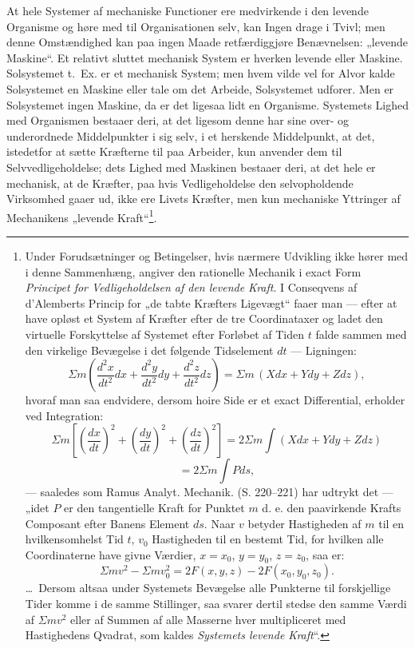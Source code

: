 \documentclass[11pt]{book}
\begin{document}
At hele Systemer af mechaniske Functioner ere medvirkende i den
levende Organisme og høre med til Organisationen selv, kan Ingen drage
i Tvivl; men denne Omstændighed kan paa ingen Maade retfærdiggjøre
Benævnelsen: „levende Maskine“. Et relativt sluttet mechanisk System
er hverken levende eller Maskine. Solsystemet t.~Ex. er et mechanisk
System; men hvem vilde vel for Alvor kalde Solsystemet en Maskine
eller tale om det Arbeide, Solsystemet udforer. Men er Solsystemet
ingen Maskine, da er det ligesaa lidt en Organisme. Systemets Lighed
med Organismen bestaaer deri, at det ligesom denne har sine over- og
underordnede Middelpunkter i sig selv, i et herskende Middelpunkt, at
det, istedetfor at sætte Kræfterne til paa Arbeider, kun anvender dem
til Selvvedligeholdelse; dets Lighed med Maskinen bestaaer deri, at det
hele er mechanisk, at de Kræfter, paa hvis Vedligeholdelse den
selvopholdende Virksomhed gaaer ud, ikke ere Livets Kræfter, men kun
mechaniske Yttringer af Mechanikens „levende Kraft“\footnote{Under
Forudsætninger og Betingelser, hvis nærmere Udvikling ikke hører med i denne
Sammenhæng, angiver den rationelle Mechanik i exact Form \emph{Principet
for Vedligeholdelsen af den levende Kraft}. I Conseqvens af d'Alemberts
Princip
for „de tabte Kræfters Ligevægt“ faaer man --- efter at have opløst et
System af Kræfter efter de tre Coordinataxer og ladet den virtuelle
Forskyttelse af Systemet efter Forløbet af Tiden $t$ falde sammen med den
virkelige Bevægelse i det følgende Tidselement $dt$ --- Ligningen:
\[ \Sigma m\left(\frac{d^2x}{dt^2}dx + \frac{d^2y}{dt^2}dy
 + \frac{d^2z}{dt^2}dz\right) = \Sigma m\,(Xdx + Ydy + Zdz), \]
hvoraf man saa endvidere, dersom hoire Side er et exact Differential, erholder
ved Integration:
\[ \Sigma m\left[\left(\frac{dx}{dt}\right)^2 + \left(\frac{dy}{dt}\right)^2
 + \left(\frac{dz}{dt}\right)^2\right] = 2\Sigma m\int(Xdx + Ydy + Zdz) \]
\[ = 2\Sigma m\int Pds, \]
--- saaledes som Ramus Analyt. Mechanik. (S. 220--221) har udtrykt det ---
„idet $P$ er den tangentielle Kraft for Punktet $m$ d. e. den paavirkende
Krafts Composant efter Banens Element $ds$. Naar $v$ betyder Hastigheden af
$m$ til en hvilkensomhelst Tid $t$, $v_0$ Hastigheden til en bestemt Tid, for
hvilken alle Coordinaterne have givne Værdier, $x = x_0$, $y = y_0$,
$z = z_0$, saa er:
\[ \Sigma mv^2 - \Sigma mv_0^2 = 2F(x, y, z) - 2F(x_0, y_0, z_0). \]
\dots\ Dersom altsaa under Systemets Bevægelse alle Punkterne til
forskjellige Tider komme i de samme Stillinger, saa svarer dertil stedse den
samme Værdi af $\Sigma mv^2$ eller af Summen af alle Masserne hver
multipliceret med Hastighedens Qvadrat, som kaldes \emph{Systemets levende
Kraft}“.}.
\end{document}
